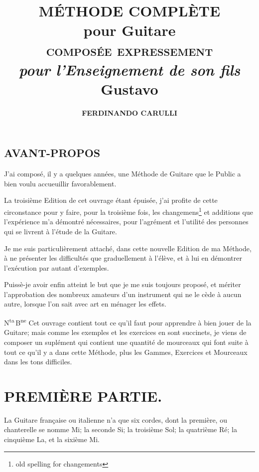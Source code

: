 \documentclass[a4paper]{book}
\title{%
  \Huge\textbf{MÉTHODE COMPLÈTE}\\
  pour Guitare\\
  \LARGE\textsc{composée expressement}\\
  \textit{pour l'Enseignement de son fils}\\
  \huge\textbf{Gustavo}}
\author{\Huge\bfseries FERDINANDO CARULLI}
\date{}
\begin{document}
\frontmatter

\maketitle
\thispagestyle{empty}
\cleardoublepage

\mainmatter

\chapter*{AVANT-PROPOS}

J'ai composé, il y a quelques années, une Méthode de Guitare que le Public a bien voulu accueuillir favorablement.

La troisième Edition de cet ouvrage étant épuisée, j'ai profite de cette circonstance pour y faire, pour la troisième fois, les changemens\footnote{old spelling for changements} et additions que l'expérience m'a démontré nécessaires, pour l'agrément et l'utilité des personnes qui se livrent à l'étude de la Guitare.

Je me suis particulièrement attaché, dans cette nouvelle Edition de ma Méthode, à ne présenter les difficultés que graduellement à l'élève, et à lui en démontrer l'exécution par autant d'exemples.

Puissè-je avoir enfin atteint le but que je me suis toujours proposé, et mériter l'approbation des nombreux amateurs d'un instrument qui ne le cède à aucun autre, lorsque l'on sait avec art en ménager les effets.

N\textsuperscript{ta}\,B\textsuperscript{ne}
Cet ouvrage contient tout ce qu'il faut pour apprendre à bien jouer de la Guitare; mais comme les exemples et les exercices en sont succinets, je viens de composer un suplément qui contient une quantité de mourceaux qui font suite à tout ce qu'il y a dans cette Méthode, plus les Gammes, Exercices et Mourceaux dans les tons difficiles.
\clearpage

{
  \let\cleardoublepage\clearpage
  \renewcommand{\contentsname}{Cette Méthode est divisée en trois Parties}
  \tableofcontents
}

\part{PREMIÈRE PARTIE.}

La Guitare française ou italienne n'a que six cordes, dont la première, ou chanterelle se nomme Mi; la seconde Si; la troisième Sol; la quatrième Ré; la cinquième La, et la sixième Mi.
\end{document}
